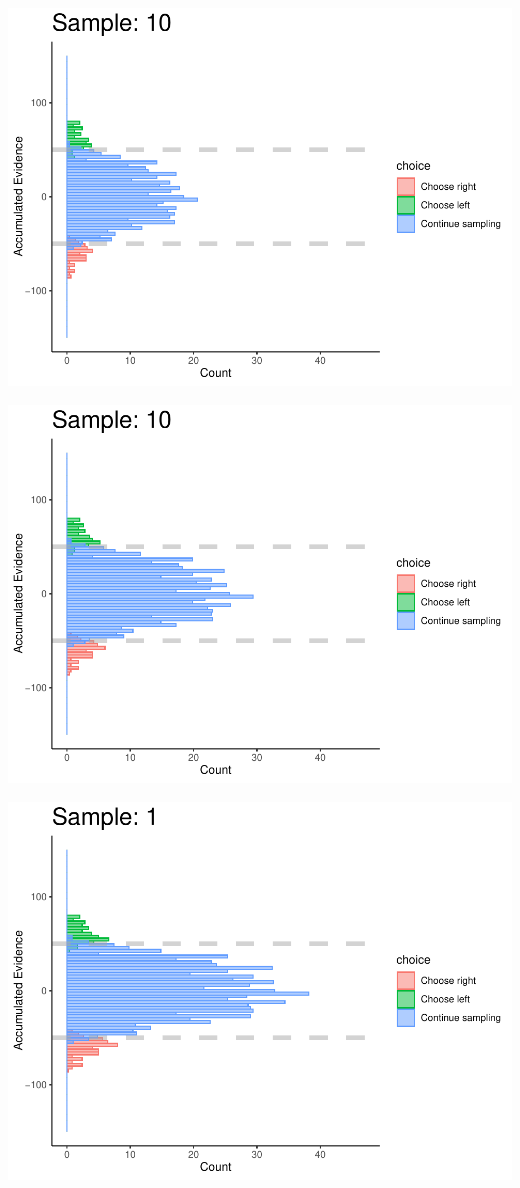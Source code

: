 \documentclass[
]{book}
\begin{document}
\begin{center}\includegraphics[width=0.8\linewidth]{LateNightBayes_files/figure-latex/fixed_check-97} \end{center}

\begin{center}\includegraphics[width=0.8\linewidth]{LateNightBayes_files/figure-latex/fixed_check-98} \end{center}

\begin{center}\includegraphics[width=0.8\linewidth]{LateNightBayes_files/figure-latex/fixed_check-99} \end{center}
\end{document}
